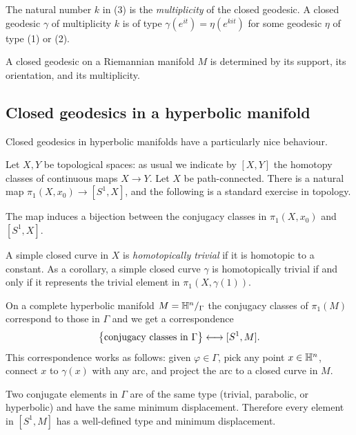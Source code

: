 The natural number $k$ in (3) is the \emph{multiplicity} of the closed geodesic. A closed geodesic $\gamma$ of multiplicity $k$ is of type $\gamma (e^{it}) = \eta(e^{kit})$ for some geodesic $\eta$ of type (1) or (2). 

\begin{oss}
A closed geodesic on a Riemannian manifold $M$ is determined by its support, its orientation, and its multiplicity.
\end{oss}

\subsection{Closed geodesics in a hyperbolic manifold}
Closed geodesics in hyperbolic manifolds have a particularly nice behaviour. 

Let $X,Y$ be topological spaces: as usual we indicate by $[X,Y]$ the homotopy classes of continuous maps $X \to Y$. Let $X$ be path-connected. There is a natural map $\pi_1(X,x_0) \to [S^1, X]$, and the following is a standard exercise in topology.\index{$[X,Y]$} 

\begin{ex}
The map induces a bijection between the conjugacy classes in $\pi_1(X,x_0)$ and $[S^1,X]$.
\end{ex}
A simple closed curve in $X$ is \emph{homotopically trivial} if it is homotopic to a constant. As a corollary, a simple closed curve $\gamma$ is homotopically trivial if and only if it represents the trivial element in $\pi_1(X,\gamma(1))$.

On a complete hyperbolic manifold $M=\mathbb{H}^n/_\Gamma$ the conjugacy classes of $\pi_1(M)$ correspond to those in $\Gamma$ and we get a correspondence
$$\big\{ {\rm conjugacy\ classes\ in\ }\Gamma\big\} \longleftrightarrow [S^1, M].$$
This correspondence works as follows: given $\varphi \in \Gamma$, pick any point $x\in\mathbb{H}^n$, connect $x$ to $\gamma(x)$ with any arc, and project the arc to a closed curve in $M$.

Two conjugate elements in $\Gamma$ are of the same type (trivial, parabolic, or hyperbolic) and have the same minimum displacement. Therefore every element in $[S^1, M]$ has a well-defined type and minimum displacement.

